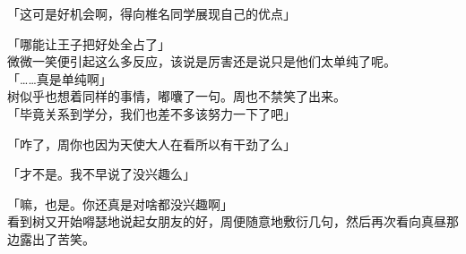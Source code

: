 「这可是好机会啊，得向椎名同学展现自己的优点」

「哪能让王子把好处全占了」\\

微微一笑便引起这么多反应，该说是厉害还是说只是他们太单纯了呢。\\

「……真是单纯啊」\\

树似乎也想着同样的事情，嘟囔了一句。周也不禁笑了出来。\\

「毕竟关系到学分，我们也差不多该努力一下了吧」

「咋了，周你也因为天使大人在看所以有干劲了么」

「才不是。我不早说了没兴趣么」

「嘛，也是。你还真是对啥都没兴趣啊」\\

看到树又开始嘚瑟地说起女朋友的好，周便随意地敷衍几句，然后再次看向真昼那边露出了苦笑。
